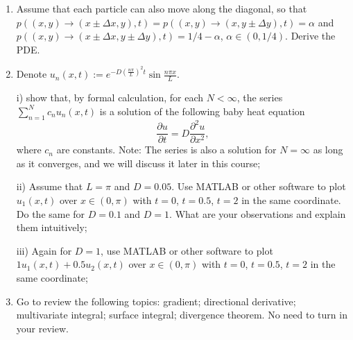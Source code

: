 \documentclass[6pt]{article}
\numberwithin{equation}{section}
\begin{document}
\begin{enumerate}
 

\item Assume that each particle can also move along the diagonal, so that $p((x,y)\rightarrow (x\pm\Delta x,y),t)=p((x,y)\rightarrow (x,y\pm\Delta y),t)=\alpha$ and $p((x,y)\rightarrow (x\pm\Delta x,y\pm\Delta y),t)=1/4-\alpha$, $\alpha\in(0,1/4)$.  Derive the PDE.


\item Denote $u_n(x,t):=e^{-D(\frac{n\pi}{L})^2t} \sin \frac{n\pi x}{L}$.

i) show that, by formal calculation, for each $N<\infty$, the series $\sum_{n=1}^N c_nu_n(x,t)$ is a solution of the following baby heat equation
\[\frac{\partial u}{\partial t}=D\frac{\partial^2 u}{\partial x^2},\]
where $c_n$ are constants.  Note: The series is also a solution for $N=\infty$ as long as it converges, and we will discuss it later in this course;

ii) Assume that $L=\pi$ and $D=0.05$.  Use MATLAB or other software to plot $u_1(x,t)$ over $x\in(0,\pi)$ with $t=0$, $t=0.5$, $t=2$ in the same coordinate.  Do the same for $D=0.1$ and $D=1$.  What are your observations and explain them intuitively;

iii) Again for $D=1$, use MATLAB or other software to plot $1u_1(x,t)+0.5u_2(x,t)$ over $x\in(0,\pi)$ with $t=0$, $t=0.5$, $t=2$ in the same coordinate;
 


\item  Go to review the following topics: gradient; directional derivative; multivariate integral; surface integral; divergence theorem.  No need to turn in your review.

\end{enumerate}
\end{document}
